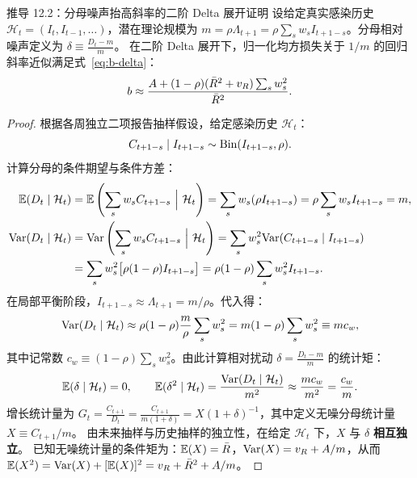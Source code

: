 \begin{theorembox}{推导 12.2：分母噪声抬高斜率的二阶 Delta 展开证明}
设给定真实感染历史 $\mathcal{H}_t = (I_t, I_{t-1}, \dots)$，潜在理论规模为 $m = \rho \Lambda_{t+1} = \rho \sum_s w_s I_{t+1-s}$。分母相对噪声定义为 $\delta \equiv \frac{D_t - m}{m}$。
在二阶 Delta 展开下，归一化均方损失关于 $1/m$ 的回归斜率近似满足式~\eqref{eq:b-delta}：
\begin{equation}
  b \approx \frac{A + (1 - \rho)(\bar{R}^2 + v_R)\sum_{s} w_s^2}{\bar{R}^2}.
  \label{eq:b-delta}
\end{equation}
\end{theorembox}

\begin{proof}
根据各周独立二项报告抽样假设，给定感染历史 $\mathcal{H}_t$：
\begin{equation}
  C_{t+1-s} \mid I_{t+1-s} \sim \mathrm{Bin}(I_{t+1-s}, \rho).
\end{equation}
计算分母的条件期望与条件方差：
\begin{align}
  \E(D_t \mid \mathcal{H}_t) &= \E\left( \sum_s w_s C_{t+1-s} \ \Big|\ \mathcal{H}_t \right) = \sum_s w_s (\rho I_{t+1-s}) = \rho \sum_s w_s I_{t+1-s} = m, \\
  \Var(D_t \mid \mathcal{H}_t) &= \Var\left( \sum_s w_s C_{t+1-s} \ \Big|\ \mathcal{H}_t \right) = \sum_s w_s^2 \Var(C_{t+1-s} \mid I_{t+1-s}) \nonumber \\
  &= \sum_s w_s^2 \big[ \rho (1 - \rho) I_{t+1-s} \big] = \rho (1 - \rho) \sum_s w_s^2 I_{t+1-s}.
\end{align}
在局部平衡阶段，$I_{t+1-s} \approx \Lambda_{t+1} = m/\rho$。代入得：
\begin{equation}
  \mathrm{Var}(D_t \mid \mathcal{H}_t) \approx \rho (1 - \rho) \frac{m}{\rho} \sum_s w_s^2 = m (1 - \rho) \sum_s w_s^2 \equiv m c_w,
\end{equation}
其中记常数 $c_w \equiv (1 - \rho)\sum_s w_s^2$。由此计算相对扰动 $\delta = \frac{D_t - m}{m}$ 的统计矩：
\begin{equation}
  \mathbb{E}(\delta \mid \mathcal{H}_t) = 0, \qquad \mathbb{E}(\delta^2 \mid \mathcal{H}_t) = \frac{\mathrm{Var}(D_t \mid \mathcal{H}_t)}{m^2} \approx \frac{m c_w}{m^2} = \frac{c_w}{m}.
\end{equation}
增长统计量为 $G_t = \frac{C_{t+1}}{D_t} = \frac{C_{t+1}}{m(1+\delta)} = X (1 + \delta)^{-1}$，其中定义无噪分母统计量 $X \equiv C_{t+1}/m$。
由未来抽样与历史抽样的独立性，在给定 $\mathcal{H}_t$ 下，$X$ 与 $\delta$ \textbf{相互独立}。
已知无噪统计量的条件矩为：$\mathbb{E}(X) = \bar{R}$，$\mathrm{Var}(X) = v_R + A/m$，从而 $\mathbb{E}(X^2) = \mathrm{Var}(X) + [\mathbb{E}(X)]^2 = v_R + \bar{R}^2 + A/m$。


\end{proof}
